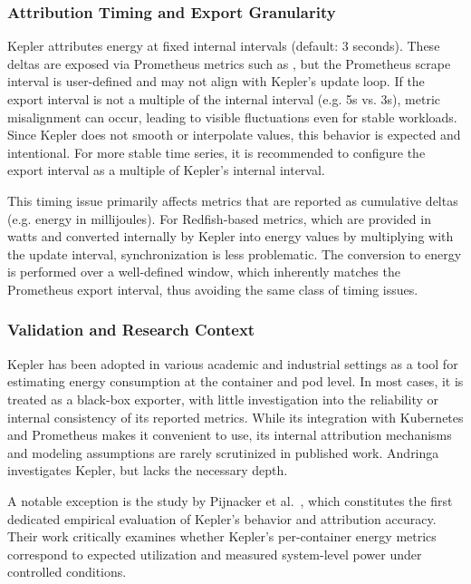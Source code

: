 \subsubsection{Attribution Timing and Export Granularity}
\label{sec:kepler-attribution-timing}

Kepler attributes energy at fixed internal intervals (default: 3 seconds). These deltas are exposed via Prometheus metrics such as , but the Prometheus scrape interval is user-defined and may not align with Kepler's update loop. If the export interval is not a multiple of the internal interval (e.g. 5s vs. 3s), metric misalignment can occur, leading to visible fluctuations even for stable workloads. Since Kepler does not smooth or interpolate values, this behavior is expected and intentional. For more stable time series, it is recommended to configure the export interval as a multiple of Kepler’s internal interval.

This timing issue primarily affects metrics that are reported as cumulative deltas (e.g. energy in millijoules). For Redfish-based metrics, which are provided in watts and converted internally by Kepler into energy values by multiplying with the update interval, synchronization is less problematic. The conversion to energy is performed over a well-defined window, which inherently matches the Prometheus export interval, thus avoiding the same class of timing issues.

\subsubsection{Validation and Research Context}

Kepler has been adopted in various academic and industrial settings as a tool for estimating energy consumption at the container and pod level. In most cases, it is treated as a black-box exporter, with little investigation into the reliability or internal consistency of its reported metrics. While its integration with Kubernetes and Prometheus makes it convenient to use, its internal attribution mechanisms and modeling assumptions are rarely scrutinized in published work. Andringa\parencite{andringa2024estimating} investigates Kepler, but lacks the necessary depth.

A notable exception is the study by Pijnacker et al.~\parencite{pijnackerEstimatingContainerlevelPower2024,pijnackerContainerlevelEnergyObservability2025}, which constitutes the first dedicated empirical evaluation of Kepler’s behavior and attribution accuracy. Their work critically examines whether Kepler’s per-container energy metrics correspond to expected utilization and measured system-level power under controlled conditions.

